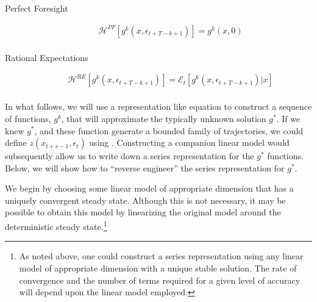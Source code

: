 \documentclass[12pt]{article}
\begin{document}
\begin{description}
\item[Perfect Foresight]
\begin{gather}
     \mathcal{H}^{PF}[g^{k}(x,\epsilon_{t+T-k+1})]=
g^{k}(x,0)\\
\end{gather}


\item[Rational Expectations] 
\begin{gather}
     \mathcal{H}^{RE}[g^{k}(x,\epsilon_{t+T-k+1})]=
\mathcal{E}_t[g^{k}(x,\epsilon_{t+T-k+1})|x]\\
\end{gather}

 \end{description}












In what follows, we will use a representation like equation  
to construct a sequence of functions, $g^k$, 
that will approximate the typically unknown solution $g^\ast$.
If we knew $g^\ast$, and  these function generate a bounded family of 
trajectories, we could define $z(x_{t+s-1},\epsilon_t)$ using .
Constructing a companion linear model would subsequently allow 
 us to write down a series representation for the $g^\ast$ functions.  Below, we will show how to ``reverse engineer'' the series representation for $g^\ast$.






We begin by choosing some linear model of appropriate dimension that 
has a uniquely convergent steady state.  
Although this is not necessary, it may be possible to obtain this model by
linearizing the original model around the deterministic steady state.\footnote{As noted above, one could construct a series representation using any linear
 model of appropriate dimension with a unique stable solution.  The rate of convergence and the number of terms required for a  given level of accuracy will depend upon the linear model employed.}
\end{document}
